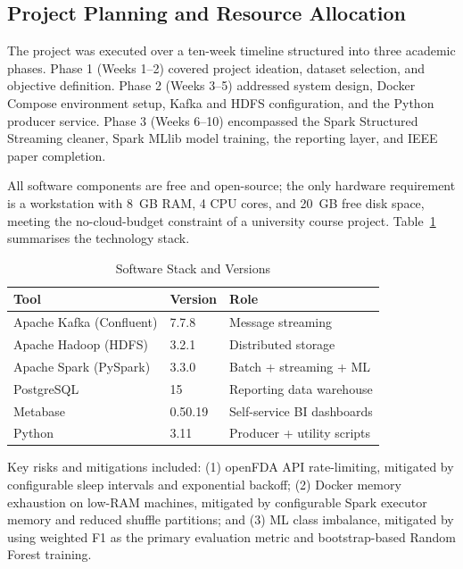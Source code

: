 \documentclass[conference]{IEEEtran}
\begin{document}
\subsection{Project Planning and Resource Allocation}

The project was executed over a ten-week timeline structured into three academic phases. Phase 1 (Weeks 1--2) covered project ideation, dataset selection, and objective definition. Phase 2 (Weeks 3--5) addressed system design, Docker Compose environment setup, Kafka and HDFS configuration, and the Python producer service. Phase 3 (Weeks 6--10) encompassed the Spark Structured Streaming cleaner, Spark MLlib model training, the reporting layer, and IEEE paper completion.

All software components are free and open-source; the only hardware requirement is a workstation with 8~GB RAM, 4 CPU cores, and 20~GB free disk space, meeting the no-cloud-budget constraint of a university course project. Table~\ref{tab:software} summarises the technology stack.

\begin{table}[htbp]
\caption{Software Stack and Versions}
\label{tab:software}
\centering
\begin{tabular}{lll}
\toprule
\textbf{Tool} & \textbf{Version} & \textbf{Role} \\
\midrule
Apache Kafka (Confluent) & 7.7.8  & Message streaming \\
Apache Hadoop (HDFS)     & 3.2.1  & Distributed storage \\
Apache Spark (PySpark)   & 3.3.0  & Batch + streaming + ML \\
PostgreSQL               & 15     & Reporting data warehouse \\
Metabase                 & 0.50.19 & Self-service BI dashboards \\
Python                   & 3.11   & Producer + utility scripts \\
\bottomrule
\end{tabular}
\end{table}

Key risks and mitigations included: (1) openFDA API rate-limiting, mitigated by configurable sleep intervals and exponential backoff; (2) Docker memory exhaustion on low-RAM machines, mitigated by configurable Spark executor memory and reduced shuffle partitions; and (3) ML class imbalance, mitigated by using weighted F1 as the primary evaluation metric and bootstrap-based Random Forest training.
\end{document}
